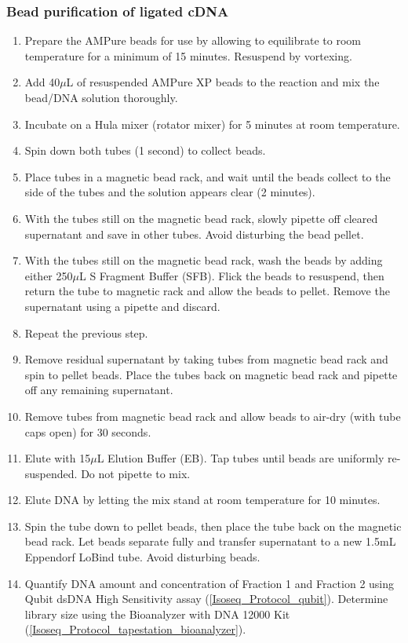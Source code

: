 \subsubsection{Bead purification of ligated cDNA}
\begin{enumerate}
	\item Prepare the AMPure beads for use by allowing to equilibrate to room temperature for a minimum of 15 minutes. Resuspend by vortexing.
	\item Add 40$\mu$L of resuspended AMPure XP beads to the reaction and mix the bead/DNA solution thoroughly.
	\item Incubate on a Hula mixer (rotator mixer) for 5 minutes at room temperature.
	\item Spin down both tubes (1 second) to collect beads.
	\item Place tubes in a magnetic bead rack, and wait until the beads collect to the side of the tubes and the solution appears clear (2 minutes).
	\item With the tubes still on the magnetic bead rack, slowly pipette off cleared supernatant and save in other tubes. Avoid disturbing the bead pellet.
	\item With the tubes still on the magnetic bead rack, wash the beads by adding either 250$\mu$L S Fragment Buffer (SFB). Flick the beads to resuspend, then return the tube to magnetic rack and allow the beads to pellet. Remove the supernatant using a pipette and discard.
	\item Repeat the previous step.
	\item Remove residual supernatant by taking tubes from magnetic bead rack and spin to pellet beads. Place the tubes back on magnetic bead rack and pipette off any remaining supernatant. 
	\item Remove tubes from magnetic bead rack and allow beads to air-dry (with tube caps open) for 30 seconds.
	\item Elute with 15$\mu$L Elution Buffer (EB). Tap tubes until beads are uniformly re-suspended. Do not pipette to mix.
	\item Elute DNA by letting the mix stand at room temperature for 10 minutes.
	\item Spin the tube down to pellet beads, then place the tube back on the magnetic bead rack. Let beads separate fully and transfer supernatant to a new 1.5mL Eppendorf LoBind tube. Avoid disturbing beads.
	\item Quantify DNA amount and concentration of Fraction 1 and Fraction 2 using Qubit dsDNA High Sensitivity assay (\cref{Isoseq_Protocol_qubit}). Determine library size using the Bioanalyzer with DNA 12000 Kit (\cref{Isoseq_Protocol_tapestation_bioanalyzer}). 
\end{enumerate}

